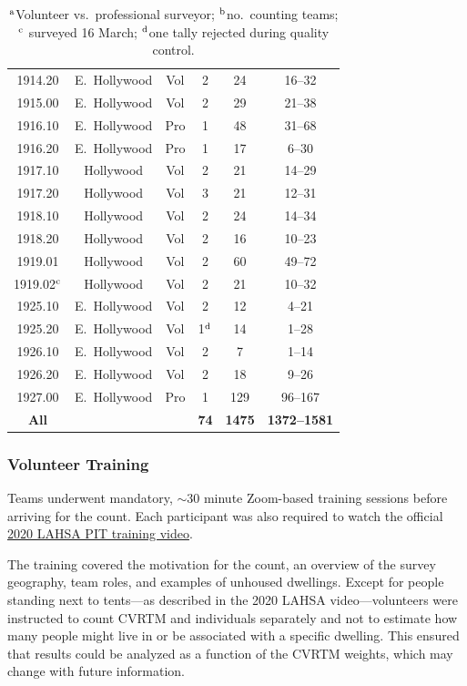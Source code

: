 \documentclass[11pt,twocolumn]{article}
\def\bfr{\bf\color{red}}
\def\Count{count}
\begin{document}
\begin{table}[t!]
{\begin{tabular}{cccccc}
1914.20 & E.~Hollywood & Vol & 2 & 24 & 16--32 \\
1915.00 & E.~Hollywood & Vol & 2 & 29 & 21--38 \\
1916.10 & E.~Hollywood & Pro & 1 & 48 & 31--68 \\
1916.20 & E.~Hollywood & Pro & 1 & 17 & 6--30 \\
1917.10 & Hollywood & Vol & 2 & 21 & 14--29 \\
1917.20 & Hollywood & Vol & 3 & 21 & 12--31 \\
1918.10 & Hollywood & Vol & 2 & 24 & 14--34 \\
1918.20 & Hollywood & Vol & 2 & 16 & 10--23 \\
1919.01 & Hollywood & Vol & 2 & 60 & 49--72 \\
1919.02$^{\rm c}$  & Hollywood & Vol & 2 & 21 & 10--32 \\
1925.10 & E.~Hollywood & Vol & 2 & 12 & 4--21 \\
1925.20 & E.~Hollywood & Vol & 1$^{\rm d}$ & 14 & 1--28 \\
1926.10 & E.~Hollywood & Vol & 2 & 7 & 1--14 \\
1926.20 & E.~Hollywood & Vol & 2 & 18 & 9--26 \\
1927.00 & E.~Hollywood & Pro & 1 & 129 & 96--167\\
\cmidrule{1-6}
{\bf All} & & & {\bf 74} & {\bfr 1475} & {\bfr 1372--1581}\\ 
\bottomrule
\end{tabular}
}
\caption*{$^{\rm a}$Volunteer vs.~professional surveyor; $^{\rm b}$no.~counting teams; 
		$^{\rm c}$ surveyed 16 March; $^{\rm d}$one tally rejected during quality control.}
\label{tbl:tractStats}
\end{table}

\subsubsection{Volunteer Training}
\label{sec:training}

Teams underwent mandatory, $\sim$30 minute Zoom-based training sessions before arriving 
for the \Count. Each participant was also required to watch the official 
\href{https://www.youtube.com/watch?v=ul94Jt6l68w}{2020 LAHSA PIT training video}.%

The training covered the motivation for the \Count, an overview of the survey geography, team roles, 
and examples of unhoused dwellings. Except for people standing next to tents---as described 
in the 2020 LAHSA video---volunteers were instructed to count CVRTM and individuals separately 
and not to estimate how many people might live in or be associated with a specific dwelling. 
This ensured that results could be analyzed as a function of the CVRTM weights, which may change 
with future information.%
\end{document}
